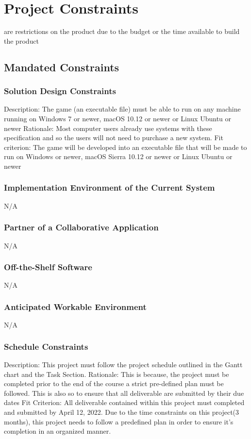 \documentclass{article}
\begin{document}
\section{Project Constraints}
are restrictions on the product due to the budget or the 
time available to build the product
\subsection{Mandated Constraints}
\subsubsection{Solution Design Constraints}
Description: The game (an executable file) must be able to run on any machine running on Windows 7 or newer, macOS 10.12 or newer or Linux Ubuntu or newer
Rationale: Most computer users already use systems with these specification and so the users will not need to purchase a new system.
Fit criterion: The game will be developed into an executable file that will be made to run on Windows or newer, macOS Sierra 10.12 or newer or Linux Ubuntu or newer
\subsubsection{Implementation Environment of the Current System}
N/A
\subsubsection{Partner of a Collaborative Application}
N/A
\subsubsection{Off-the-Shelf Software}
N/A
\subsubsection{Anticipated Workable Environment}
N/A
\subsubsection{Schedule Constraints}
Description: This project must follow the project schedule outlined in the Gantt chart and the Task Section.
Rationale: This is because, the project must be completed prior to the end of the course a strict pre-defined plan must be followed. This is also so to ensure that all deliverable are submitted by their due dates
Fit Criterion: All deliverable contained within this project must completed and submitted by April 12, 2022. 
Due to the time constraints on this project(3 months), this project needs to follow a predefined plan in order to ensure it's completion in an organized manner.
\end{document}
